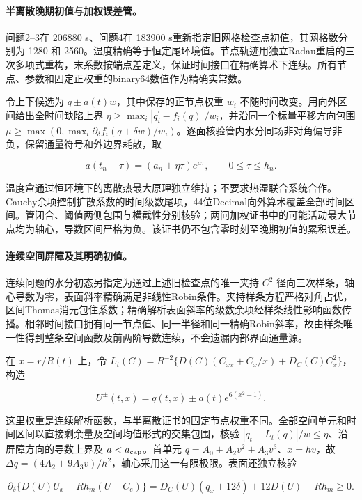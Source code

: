 \paragraph{半离散晚期初值与加权误差管。}

问题2--3在 206880 s、问题4在 183900 s重新指定旧网格检查点初值，其网格数分别为 1280 和 2560。温度精确等于恒定尾环境值。节点轨迹用独立Radau重启的三次多项式重构，末系数按端点差定义，保证时间接口在精确算术下连续。所有节点、参数和固定正权重的binary64数值作为精确实常数。

令上下候选为 $q\pm a(t)w$，其中保存的正节点权重 $w_i$ 不随时间改变。用向外区间给出全时间缺陷上界 $\eta\ge\max_i|q_i^{\prime}-f_i(q)|/w_i$，并沿同一个标量平移方向包围 $\mu\ge\max(0,\max_i\partial_\delta f_i(q+\delta w)/w_i)$。逐面核验管内水分同场非对角偏导非负，保留通量符号和外边界耗散，取

\[a(t_n+\tau)=(a_n+\eta\tau)e^{\mu\tau},\qquad 0\le\tau\le h_n.\]

温度盒通过恒环境下的离散热最大原理独立维持；不要求热湿联合系统合作。Cauchy余项控制扩散系数的时间级数尾项，44位Decimal向外算术覆盖全部时间区间。管闭合、阈值两侧包围与横截性分别核验；两问加权证书中的可能活动最大节点均为轴心，导数区间严格为负。该证书仍不包含零时刻至晚期初值的累积误差。

\paragraph{连续空间屏障及其明确初值。}

连续问题的水分初态另指定为通过上述旧检查点的唯一夹持 $C^2$ 径向三次样条，轴心导数为零，表面斜率精确满足非线性Robin条件。夹持样条方程严格对角占优，区间Thomas消元包住系数；精确解析表面斜率的级数余项经样条线性影响函数传播。相邻时间接口拥有同一节点值、同一半径和同一精确Robin斜率，故由样条唯一性得到整条空间函数及前两阶导数连续，不会遗漏内部界面通量源。

在 $x=r/R(t)$ 上，令 $L_t(C)=R^{-2}\{D(C)(C_{xx}+C_x/x)+D_C(C)C_x^2\}$，构造

\[U^{\pm}(t,x)=q(t,x)\pm a(t)e^{6(x^2-1)}.\]

这里权重是连续解析函数，与半离散证书的固定节点权重不同。全部空间单元和时间区间以直接剩余量及空间均值形式的交集包围，核验 $|q_t-L_t(q)|/w\le\eta$、沿屏障方向的导数上界及 $a<a_{\rm cap}$。首单元 $q=A_0+A_2v^2+A_3v^3$、$x=hv$，故 $\Delta q=(4A_2+9A_3v)/h^2$，轴心采用这一有限极限。表面还独立核验

\[\partial_\delta\{D(U)U_x+Rh_m(U-C_e)\}=D_C(U)(q_x+12\delta)+12D(U)+Rh_m\ge0.\]

